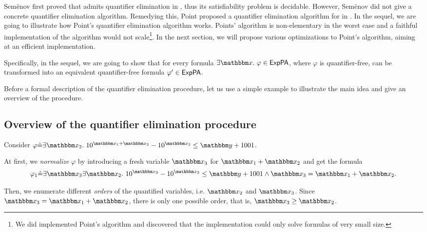 
Sem\"{e}nov first proved that  {\paexp} admits quantifier elimination in \cite{Semenov84}, thus its satisfiability problem is decidable. However, Sem\"{e}nov did not give a concrete quantifier elimination algorithm. Remedying this, Point proposed a quantifier elimination algorithm for {\paexp} in \cite{Point86}. In the sequel, we are going to illustrate how Point's quantifier elimination algorithm works. Points' algorithm is non-elementary in the worst case and a faithful implementation of the algorithm would not scale\footnote{We did implemented Point's algorithm and discovered that the implementation could only solve formulas of very small size.}. In the next section, we will propose various optimizations to Point's algorithm, aiming at an efficient implementation. 

Specifically, in the sequel, we are going to show that for every {\paexp} formula $\exists \ivarx.\ \varphi \in \paexp$, where $\varphi$ is quantifier-free, can be transformed into an equivalent quantifier-free formula $\varphi' \in {\sf ExpPA}$.

Before a formal description of the quantifier elimination procedure, let us use a simple example to illustrate the main idea and give an overview of the procedure.

\subsection{Overview of the quantifier elimination procedure}
Consider $\varphi \Def \exists \ivarx_2.\ 10^{\ivarx_1 + \ivarx_2} - 10^{\ivarx_2} \le \ivary + 1001$. 

At first, we \emph{normalize} $\varphi$ by introducing a fresh variable $\ivarx_3$ for $\ivarx_1 + \ivarx_2$ and get the formula 
$$\varphi_1 \Def \exists \ivarx_3 \exists \ivarx_2.\ 10^{\ivarx_3} - 10^{\ivarx_2} \le \ivary + 1001 \wedge \ivarx_3 = \ivarx_1 + \ivarx_2.$$

Then, we enumerate different \emph{orders} of the quantified variables, i.e. $\ivarx_2$ and $\ivarx_3$. Since $\ivarx_3 = \ivarx_1 + \ivarx_2$, there is only one possible order, that is, $\ivarx_3 \ge \ivarx_2$.

